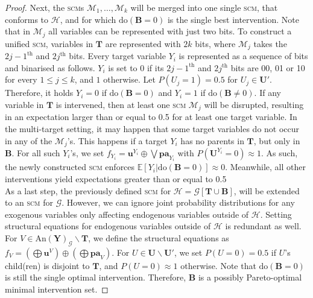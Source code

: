 \begin{proof}
    Next, the \textsc{scm}s $\mathcal{M}_1,\dots,\mathcal{M}_k$ will be merged into one single \textsc{scm}, that conforms to $\mathcal{H}$, and for which $\text{do}(\mathbf{B}=0)$ is the single best intervention. Note that in $\mathcal{M}_j$ all variables can be represented with just two bits. To construct a unified \textsc{scm}, variables in $\mathbf{T}$ are represented with $2k$ bits, where $\mathcal{M}_j$ takes the $2j-1^{\text{th}}$ and $2j^{\text{th}}$ bits. Every target variable $Y_i$ is represented as a sequence of bits and binarised as follows. $Y_i$ is set to $0$ if its $2j-1^{\text{th}}$ and $2j^{\text{th}}$ bits are 00, 01 or 10 for every $1 \leq j \leq k$, and $1$ otherwise. Let $P(U_j=1) = 0.5$ for $U_j \in \mathbf{U}'$. Therefore, it holds $Y_i = 0$ if $\text{do}(\mathbf{B}=0)$ and $Y_i=1$ if $\text{do}(\mathbf{B}\neq 0)$.
    If any variable in $\mathbf{T}$ is intervened, then at least one \textsc{scm} $\mathcal{M}_j$ will be disrupted, resulting in an expectation larger than or equal to 0.5 for at least one target variable.
    In the multi-target setting, it may happen that some target variables do not occur in any of the $\mathcal{M}_j$'s. This happens if a target $Y_i$ has no parents in  $\mathbf{T}$, but only in $\mathbf{B}$. For all such $Y_i$'s, we set $f_{Y_i} = \mathbf{u}^{Y_i} \oplus \bigvee \mathbf{pa}_{Y_i}$ with $P(\mathbf{U}^{Y_i} = 0) \approx 1$. As such, the newly constructed \textsc{scm} enforces $\mathbb{E}[Y_i | \text{do}(\mathbf{B}=0)] \approx 0$. Meanwhile, all other interventions yield expectations greater than or equal to 0.5
    \vspace{0.2cm}\\
    As a last step, the previously defined \textsc{scm} for $\mathcal{H} = \mathcal{G}[\mathbf{T} \cup \mathbf{B}]$, will be extended to an \textsc{scm} for $\mathcal{G}$. However, we can ignore joint probability distributions for any exogenous variables only affecting endogenous variables outside of $\mathcal{H}$. Setting structural equations for endogenous variables outside of $\mathcal{H}$ is redundant as well. For $V \in \text{An}(\mathbf{Y})_{\mathcal{G}} \backslash \mathbf{T}$, we define the structural equations as $f_V = (\bigoplus \mathbf{u}^V) \oplus (\bigoplus \mathbf{pa}_V)$. For $U \in \mathbf{U} \backslash \mathbf{U}'$, we set $P(U=0)=0.5$ if $U$'s child(ren) is disjoint to $\mathbf{T}$, and $P(U=0)\approx 1$ otherwise. Note that $\text{do}(\mathbf{B}=0)$ is still the single optimal intervention. Therefore, $\mathbf{B}$ is a possibly Pareto-optimal minimal intervention set. 
\end{proof}

